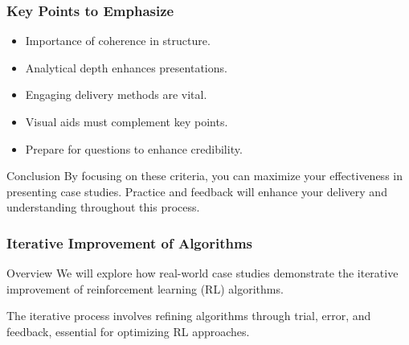 \documentclass[aspectratio=169]{beamer}
\begin{document}
\begin{frame}[fragile]
    \frametitle{Key Points to Emphasize}
    \begin{itemize}
        \item Importance of coherence in structure.
        \item Analytical depth enhances presentations.
        \item Engaging delivery methods are vital.
        \item Visual aids must complement key points.
        \item Prepare for questions to enhance credibility.
    \end{itemize}
    
    \begin{block}{Conclusion}
        By focusing on these criteria, you can maximize your effectiveness in presenting case studies. Practice and feedback will enhance your delivery and understanding throughout this process.
    \end{block}
\end{frame}

\begin{frame}[fragile]
    \frametitle{Iterative Improvement of Algorithms}
    \begin{block}{Overview}
        We will explore how real-world case studies demonstrate the iterative improvement of reinforcement learning (RL) algorithms.
    \end{block}
    The iterative process involves refining algorithms through trial, error, and feedback, essential for optimizing RL approaches.
\end{frame}
\end{document}
